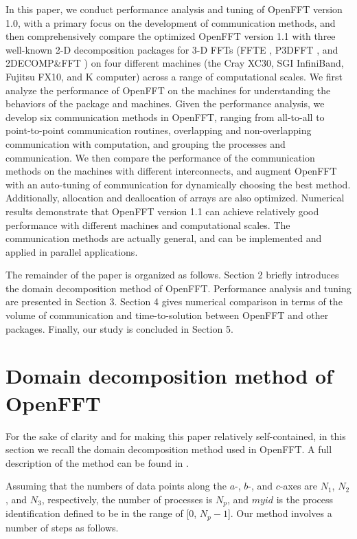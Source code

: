 In this paper, we conduct performance analysis and tuning of OpenFFT version 1.0, with a primary focus on the development of communication methods, and then comprehensively compare the optimized OpenFFT version 1.1 with three well-known 2-D decomposition packages for 3-D FFTs (FFTE \cite{takahashi2010implementation,ffte}, P3DFFT \cite{doi:10.1137/11082748X,p3dfft}, and 2DECOMP\&FFT \cite{Li2010,2DECOMP}) on four different machines (the Cray XC30, SGI InfiniBand, Fujitsu FX10, and K computer) across a range of computational scales. We first analyze the performance of OpenFFT on the machines for understanding the behaviors of the package and machines. Given the performance analysis, we develop six communication methods in OpenFFT, ranging from all-to-all to point-to-point communication routines, overlapping and non-overlapping communication with computation, and grouping the processes and communication. We then compare the performance of the communication methods on the machines with different interconnects, and augment OpenFFT with an auto-tuning of communication for dynamically choosing the best method. Additionally, allocation and deallocation of arrays are also optimized. Numerical results demonstrate that OpenFFT version 1.1 can achieve relatively good performance with different machines and computational scales. The communication methods are actually general, and can be implemented and applied in parallel applications.

The remainder of the paper is organized as follows. Section 2 briefly introduces the domain decomposition method of OpenFFT. Performance analysis and tuning are presented in Section 3. Section 4 gives numerical comparison in terms of the volume of communication and time-to-solution between OpenFFT and other packages. Finally, our study is concluded in Section 5. 


\section{Domain decomposition method of OpenFFT}
\label{Methods}

For the sake of clarity and for making this paper relatively self-contained, in this section we recall the domain decomposition method used in OpenFFT. A full description of the method can be found in \cite{Duy2014153}. 

Assuming that the numbers of data points along the $a$-, $b$-, and $c$-axes are $N_{\mathrm{1}}$, $N_{\mathrm{2}}$, and $N_{\mathrm{3}}$, respectively, the number of processes is $N_p$, and $myid$ is the process identification defined to be in the range of [0, $N_p-1$]. Our method involves a number of steps as follows. 

